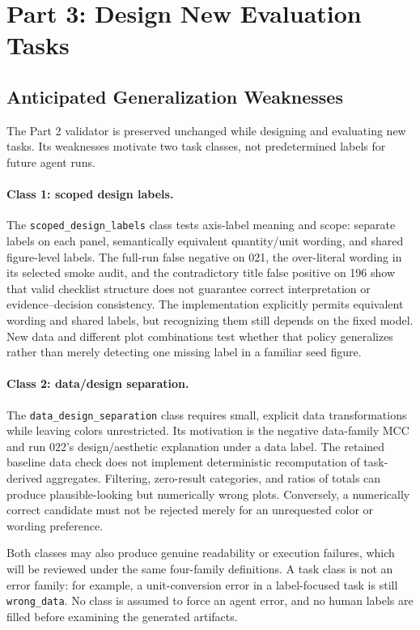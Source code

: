 \documentclass[11pt]{article}
\begin{document}
\section{Part 3: Design New Evaluation Tasks}

\subsection{Anticipated Generalization Weaknesses}

The Part 2 validator is preserved unchanged while designing and evaluating
new tasks. Its weaknesses motivate two task classes, not predetermined labels
for future agent runs.

\paragraph{Class 1: scoped design labels.}
The \texttt{scoped\_design\_labels} class tests axis-label meaning and scope:
separate labels on each panel, semantically equivalent quantity/unit wording,
and shared figure-level labels. The full-run false negative on 021, the
over-literal wording in its selected smoke audit, and the contradictory
title false positive on 196 show that valid checklist structure does not
guarantee correct interpretation or evidence--decision consistency.
The implementation explicitly permits equivalent wording and shared labels,
but recognizing them still depends on the fixed model. New data and different
plot combinations test whether that policy generalizes rather than merely
detecting one missing label in a familiar seed figure.

\paragraph{Class 2: data/design separation.}
The \texttt{data\_design\_separation} class requires small, explicit data
transformations while leaving colors unrestricted. Its motivation is the
negative data-family MCC and run 022's design/aesthetic explanation under a
data label. The retained baseline data check does not implement deterministic
recomputation of task-derived aggregates. Filtering, zero-result categories, and ratios of
totals can produce plausible-looking but numerically wrong plots.
Conversely, a numerically correct candidate must not be rejected merely for
an unrequested color or wording preference.

Both classes may also produce genuine readability or execution failures,
which will be reviewed under the same four-family definitions. A task class
is not an error family: for example, a unit-conversion error in a label-focused
task is still \texttt{wrong\_data}. No class is assumed to force an agent error,
and no human labels are filled before examining the generated artifacts.
\end{document}
